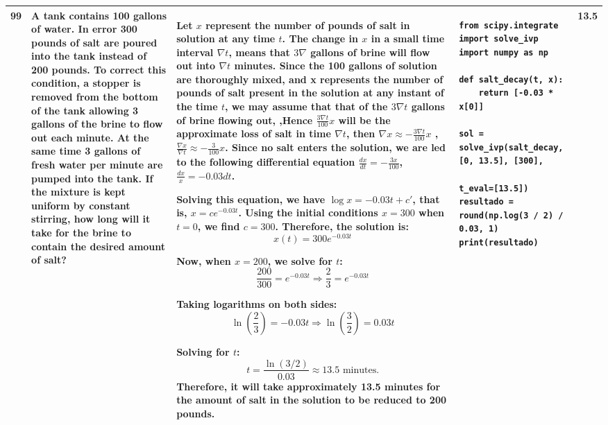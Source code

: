 \documentclass[a4paper,12pt]{article}
\begin{document}
\begin{longtable}{|p{0.3cm}|p{}|p{10cm}|p{}|p{1.5cm}|}
99 & A tank contains 100 gallons of water. In error 300 pounds of salt are poured into the tank instead of 200 pounds. To correct this condition, a stopper is removed from the bottom of the tank allowing 3 gallons of the brine to flow out each minute. At the same time 3 gallons of fresh water per minute are pumped into the tank. If the mixture is kept uniform by constant stirring, how long will it take for the brine to contain the desired amount of salt? &
Let $x$ represent the number of pounds of salt in solution at any time $t$. The change in $x$ in a small time interval $\nabla t$, means that $3\nabla$ gallons of brine will flow out into $\nabla t$ minutes. Since the 100 gallons of solution are thoroughly mixed, and x represents the number of pounds of salt present in the solution at any instant of the time $t$, we may assume that that of the $3\nabla t$ gallons of brine flowing out, ,Hence $ \frac{3\nabla t}{100} x$ will be the approximate loss of salt in time $\nabla t$, then $\nabla x \approx -\frac{3\nabla t}{100} x $  ,   $\frac{\nabla x}{\nabla t} \approx - \frac{3}{100} x $.  Since no salt enters the solution, we are led to the following differential equation
$\frac{dx}{dt}  = -\frac{3x}{100}$, $\frac{dx}{x} = -0.03dt$.

Solving this equation, we have $\log x = -0.03t + c'$, that is, $x = ce^{-0.03t}$. Using the initial conditions $x = 300$ when $t = 0$, we find $c = 300$. Therefore, the solution is:
\[
x(t) = 300e^{-0.03t}
\]

Now, when $x = 200$, we solve for $t$:
\[
\frac{200}{300} = e^{-0.03t} \Rightarrow \frac{2}{3} = e^{-0.03t}
\]

Taking logarithms on both sides:
\[
\ln\left(\frac{2}{3}\right) = -0.03t \Rightarrow \ln\left(\frac{3}{2}\right) = 0.03t
\]

Solving for $t$:
\[t = \frac{\ln(3/2)}{0.03} \approx 13.5 \text{ minutes.}\]
Therefore, it will take approximately 13.5 minutes for the amount of salt in the solution to be reduced to 200 pounds. &
\begin{verbatim}
from scipy.integrate import solve_ivp
import numpy as np

def salt_decay(t, x):
    return [-0.03 * x[0]]

sol = solve_ivp(salt_decay, [0, 13.5], [300],
                t_eval=[13.5])
resultado = round(np.log(3 / 2) / 0.03, 1)
print(resultado)
\end{verbatim}
& 13.5 \\ \hline


\end{longtable}
\end{document}
